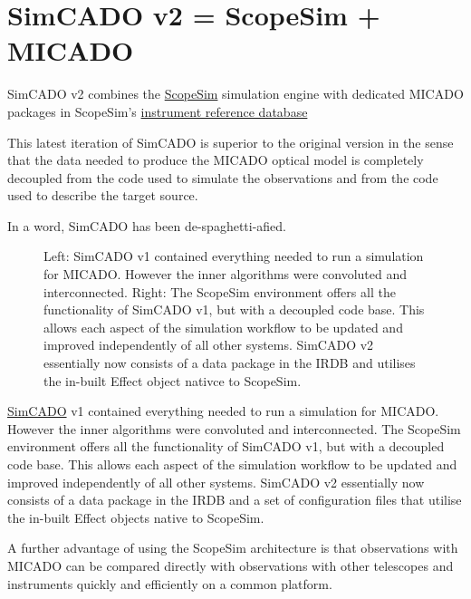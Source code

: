 

\section{SimCADO v2 = ScopeSim + MICADO%
  \label{simcado-v2-scopesim-micado}%
}

SimCADO v2 combines the \href{https://scopesim.readthedocs.io/en/latest/}{ScopeSim} simulation engine with dedicated MICADO packages in ScopeSim's \href{https://github.com/astronomyk/irdb}{instrument reference database}

This latest iteration of SimCADO is superior to the original version in the sense that the data needed to produce the MICADO optical model is completely decoupled from the code used to simulate the observations and from the code used to describe the target source.

In a word, SimCADO has been de-spaghetti-afied.

\begin{figure}[H]
\noindent{}\label{fig-simcado-evolution}

\caption{Left: SimCADO v1 contained everything needed to run a simulation for MICADO.
However the inner algorithms were convoluted and interconnected.
Right: The ScopeSim environment offers all the functionality of SimCADO v1, but with a decoupled code base.
This allows each aspect of the simulation workflow to be updated and improved independently of all other systems.
SimCADO v2 essentially now consists of a data package in the IRDB and utilises the in-built Effect object nativce to ScopeSim.}
\end{figure}

\href{https://simcado.readthedocs.io/en/latest/}{SimCADO} v1 contained everything needed to run a simulation for MICADO.
However the inner algorithms were convoluted and interconnected.
The ScopeSim environment offers all the functionality of SimCADO v1, but with a decoupled code base.
This allows each aspect of the simulation workflow to be updated and improved independently of all other systems.
SimCADO v2 essentially now consists of a data package in the IRDB and a set of configuration files that utilise the in-built Effect objects native to ScopeSim.

A further advantage of using the ScopeSim architecture is that observations with MICADO can be compared directly with observations with other telescopes and instruments quickly and efficiently on a common platform.
